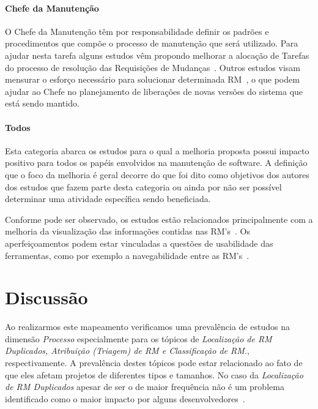 \paragraph{Chefe da Manutenção} O Chefe da Manutenção têm por responsabilidade
definir os padrões e procedimentos que compõe o processo de manutenção que será
utilizado. Para ajudar nesta tarefa alguns estudos  vêm propondo melhorar a
alocação de Tarefas do processo de resolução das Requisições de
Mudanças~\cite{netto2010automated}. Outros estudos visam mensurar o esforço
necessário para solucionar determinada RM~\cite{Vijayakumar2014, Nagwani2010}, o
que podem ajudar ao Chefe no planejamento de liberações de novas versões do
sistema que está sendo mantido.

\paragraph{Todos} Esta categoria abarca os estudos para o qual a melhoria
proposta possui impacto positivo para todos os papéis envolvidos na manutenção
de software. A definição que o foco da melhoria é geral decorre do que foi dito
como objetivos dos autores dos estudos que fazem parte desta categoria ou ainda
por não ser possível determinar uma atividade específica sendo beneficiada.

Conforme pode ser observado, os estudos estão relacionados principalmente com a
melhoria da  visualização das informações contidas nas RM's~\cite{hora2012bug,
	takama2013application, dal2014bug}. Os aperfeiçoamentos podem estar
vinculadas a questões de usabilidade das ferramentas, como por exemplo a
navegabilidade entre as RM's~\cite{dal2014bug}.

\section{Discussão}
\label{sec:discussao}

Ao realizarmos este mapeamento verificamos uma prevalência de estudos na
dimensão \textit{Processo} especialmente para os tópicos de \textit{Localização
	de RM Duplicados, Atribuição (Triagem) de RM e Classificação de RM.},
respectivamente. A prevalência destes tópicos pode estar relacionado ao fato de
que eles afetam projetos de diferentes tipos e tamanhos. No caso da
\textit{Localização de RM Duplicados} apesar de ser o de maior frequência não é
um problema identificado como o maior impacto por alguns
desenvolvedores~\cite{Bettenburg2008a}.





